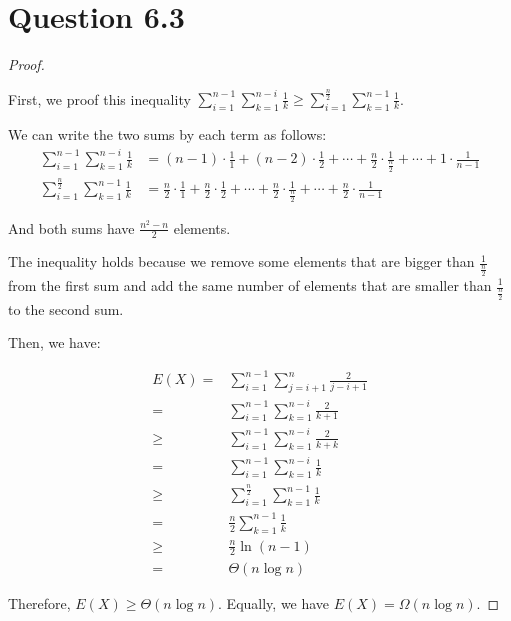 \documentclass[a4paper,12pt]{article}
\begin{document}
\newpage
\section*{Question 6.3}

\begin{proof}
$ $

First, we proof this inequality $\sum_{i=1}^{n-1} \sum_{k=1}^{n-i} \frac{1}{k} \geq \sum_{i=1}^{\frac{n}{2}} \sum_{k=1}^{n-1} \frac{1}{k}$.

We can write the two sums by each term as follows:
\begin{align*}
	\sum_{i=1}^{n-1} \sum_{k=1}^{n-i} \frac{1}{k} &= (n-1) \cdot \frac{1}{1} + (n-2) \cdot \frac{1}{2} + \cdots + \frac{n}{2} \cdot \frac{1}{\frac{n}{2}} + \cdots + 1 \cdot \frac{1}{n-1}\\ 
	\sum_{i=1}^{\frac{n}{2}} \sum_{k=1}^{n-1} \frac{1}{k} &= \frac{n}{2} \cdot \frac{1}{1} + \frac{n}{2} \cdot \frac{1}{2} + \cdots + \frac{n}{2} \cdot \frac{1}{\frac{n}{2}} + \cdots + \frac{n}{2} \cdot \frac{1}{n-1}
\end{align*}

And both sums have $\frac{n^2-n}{2}$ elements.

The inequality holds because we remove some elements that are bigger than $\frac{1}{\frac{n}{2}}$ from the first sum and add the same number of elements that are smaller than $\frac{1}{\frac{n}{2}}$ to the second sum.

Then, we have:
\begin{center}
	\begin{align*}
		E(X) =& \sum_{i=1}^{n-1} \sum_{j=i+1}^{n} \frac{2}{j-i+1}\\
		=& \sum_{i=1}^{n-1} \sum_{k=1}^{n-i} \frac{2}{k+1}\\
		\geq& \sum_{i=1}^{n-1} \sum_{k=1}^{n-i} \frac{2}{k+k}\\
		=& \sum_{i=1}^{n-1} \sum_{k=1}^{n-i} \frac{1}{k}\\
		\geq& \sum_{i=1}^{\frac{n}{2}} \sum_{k=1}^{n-1} \frac{1}{k}\\
		=& \frac{n}{2} \sum_{k=1}^{n-1} \frac{1}{k}\\
		\geq& \frac{n}{2} \ln (n-1)\\
		=& \Theta(n \log n)
	\end{align*}
\end{center}

Therefore, $E(X) \geq \Theta(n \log n)$.
Equally, we have $E(X) = \Omega(n \log n)$.
\end{proof}
\end{document}
